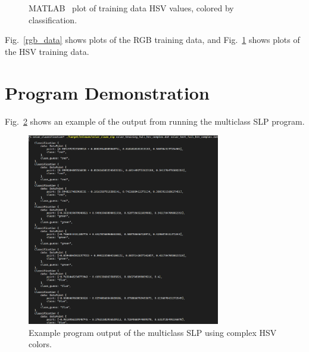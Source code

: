 \documentclass[twoside]{IEEEtran}
\begin{document}
\begin{figure}[!t]
    \hfill
    \hfill
    \caption{MATLAB~\cite{matlab} plot of training data HSV values, colored by classification.}%
    \label{hsv_data}
\end{figure}

Fig.~\ref{rgb_data} shows plots of the RGB training data, and Fig.~\ref{hsv_data} shows
plots of the HSV training data.

\section{Program Demonstration}%
\label{program_demo}

Fig.~\ref{program_output} shows an example of the output from running the multiclass SLP program.

\begin{figure}[!t]
    \centering
    \includegraphics[width=0.75\textwidth]{program_demo.png}
    \hfil
    \caption{Example program output of the multiclass SLP using complex HSV colors.}%
    \label{program_output}
\end{figure}
\end{document}
